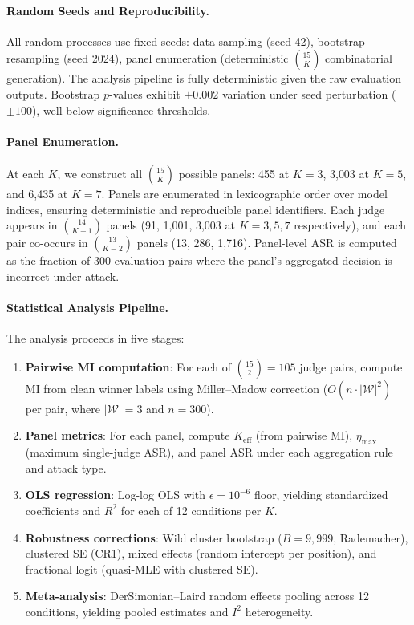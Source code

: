 \paragraph{Random Seeds and Reproducibility.} All random processes use fixed seeds: data sampling (seed 42), bootstrap resampling (seed 2024), panel enumeration (deterministic $\binom{15}{K}$ combinatorial generation). The analysis pipeline is fully deterministic given the raw evaluation outputs. Bootstrap $p$-values exhibit ${\pm}0.002$ variation under seed perturbation ($\pm 100$), well below significance thresholds.

\paragraph{Panel Enumeration.} At each $K$, we construct all $\binom{15}{K}$ possible panels: 455 at $K{=}3$, 3{,}003 at $K{=}5$, and 6{,}435 at $K{=}7$. Panels are enumerated in lexicographic order over model indices, ensuring deterministic and reproducible panel identifiers. Each judge appears in $\binom{14}{K-1}$ panels (91, 1{,}001, 3{,}003 at $K{=}3,5,7$ respectively), and each pair co-occurs in $\binom{13}{K-2}$ panels (13, 286, 1{,}716). Panel-level ASR is computed as the fraction of 300 evaluation pairs where the panel's aggregated decision is incorrect under attack.

\paragraph{Statistical Analysis Pipeline.} The analysis proceeds in five stages:
\begin{enumerate}
\item \textbf{Pairwise MI computation}: For each of $\binom{15}{2}{=}105$ judge pairs, compute MI from clean winner labels using Miller--Madow correction ($O(n \cdot |\mathcal{W}|^2)$ per pair, where $|\mathcal{W}|{=}3$ and $n{=}300$).
\item \textbf{Panel metrics}: For each panel, compute $K_{\mathrm{eff}}$ (from pairwise MI), $\eta_{\max}$ (maximum single-judge ASR), and panel ASR under each aggregation rule and attack type.
\item \textbf{OLS regression}: Log-log OLS with $\epsilon{=}10^{-6}$ floor, yielding standardized coefficients and $R^2$ for each of 12 conditions per $K$.
\item \textbf{Robustness corrections}: Wild cluster bootstrap ($B{=}9{,}999$, Rademacher), clustered SE (CR1), mixed effects (random intercept per position), and fractional logit (quasi-MLE with clustered SE).
\item \textbf{Meta-analysis}: DerSimonian--Laird random effects pooling across 12 conditions, yielding pooled estimates and $I^2$ heterogeneity.
\end{enumerate}

